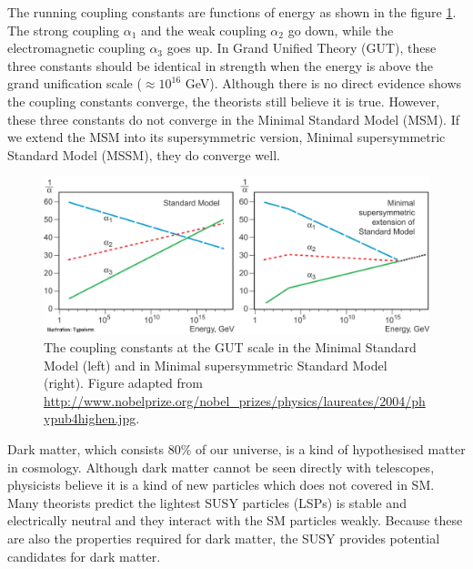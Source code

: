 \documentclass[12pt]{report}
\begin{document}
The running coupling constants are functions of energy as shown in the figure \ref{fig: running_coupling_constant}.
The strong coupling $\alpha_{1}$ and the weak coupling $\alpha_{2}$ go down, while the electromagnetic coupling $\alpha_{3}$ goes up.
In Grand Unified Theory (GUT), these three constants should be identical in strength when the energy is above the grand unification scale ($\approx 10^{16}$ GeV).
Although there is no direct evidence shows the coupling constants converge, the theorists still believe it is true.
However, these three constants do not converge in the Minimal Standard Model (MSM). 
If we extend the MSM into its supersymmetric version, Minimal supersymmetric Standard Model (MSSM), they do converge well.
\begin{figure}[htbp]
\begin{center}
\includegraphics[scale=0.75]{figures/phypub4highen.pdf}
\caption{The coupling constants at the GUT scale in the Minimal Standard Model (left) and in Minimal supersymmetric Standard Model (right).
Figure adapted from \url{http://www.nobelprize.org/nobel_prizes/physics/laureates/2004/phypub4highen.jpg}.}
\label{fig: running_coupling_constant}
\end{center}
\end{figure}

Dark matter, which consists $80\%$ of our universe, is a kind of hypothesised matter in cosmology.
Although dark matter cannot be seen directly with telescopes, physicists believe it is a kind of new particles which does not covered in SM.
Many theorists predict the lightest SUSY particles (LSPs) is stable and electrically neutral and they interact with the SM particles weakly.
Because these are also the properties required for dark matter, the SUSY provides potential candidates for dark matter.
\end{document}

